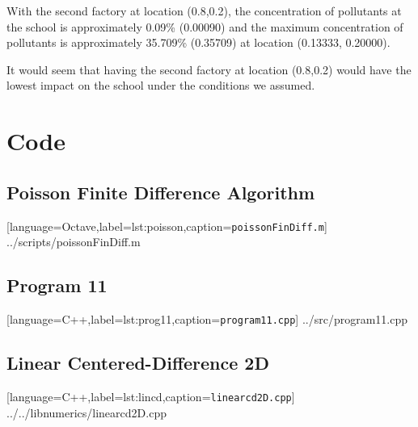 \documentclass[12pt]{article}
\begin{document}
With the second factory at location (0.8,0.2), the concentration of
pollutants at the school is approximately 0.09\% (0.00090) and the maximum
concentration of pollutants is approximately 35.709\% (0.35709) at
location (0.13333, 0.20000).

It would seem that having the second factory at location (0.8,0.2)
would have the lowest impact on the school under the conditions we assumed.
\pagebreak
\section{Code}
\subsection{Poisson Finite Difference Algorithm}

[language=Octave,label=lst:poisson,caption=\texttt{poissonFinDiff.m}]
{../scripts/poissonFinDiff.m}
\pagebreak
\subsection{Program 11}

[language=C++,label=lst:prog11,caption=\texttt{program11.cpp}]
{../src/program11.cpp}
\pagebreak
\subsection{Linear Centered-Difference 2D}

[language=C++,label=lst:lincd,caption=\texttt{linearcd2D.cpp}]
{../../libnumerics/linearcd2D.cpp}
\end{document}
